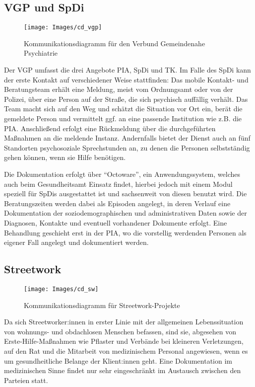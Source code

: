 \subsection{VGP und SpDi}\label{sub:vgp}

\begin{figure}[h]
	\centering
	\texttt{[image: Images/cd\_vgp]}
	\caption[Kommunikationsdiagramm VGP]{Kommunikationsdiagramm für den Verbund Gemeindenahe Psychiatrie}
	\label{fig:cdVGP}
\end{figure}

Der \ac{VGP} umfasst die drei Angebote \acf{PIA}, \acf{SpDi} und \acf{TK}. Im Falle des \ac{SpDi} kann der erste Kontakt auf verschiedener Weise stattfinden: Das mobile Kontakt- und Beratungsteam erhält eine Meldung, meist vom Ordnungsamt oder von der Polizei, über eine Person auf der Straße, die sich psychisch auffällig verhält. Das Team macht sich auf den Weg und schätzt die Situation vor Ort ein, berät die gemeldete Person und vermittelt ggf. an eine passende Institution wie z.B. die \ac{PIA}. Anschließend erfolgt eine Rückmeldung über die durchgeführten Maßnahmen an die meldende Instanz. Andernfalls bietet der Dienst auch an fünf Standorten psychosoziale Sprechstunden an, zu denen die Personen selbstständig gehen können, wenn sie Hilfe benötigen.

Die Dokumentation erfolgt über \enquote{Octoware}, ein Anwendungssystem, welches auch beim Gesundheitsamt Einsatz findet, hierbei jedoch mit einem Modul speziell für \acp{SpDi} ausgestattet ist und sachsenweit von diesen benutzt wird. Die Beratungszeiten werden dabei als Episoden angelegt, in deren Verlauf eine Dokumentation der soziodemographischen und administrativen Daten sowie der Diagnosen, Kontakte und eventuell vorhandener Dokumente erfolgt. Eine Behandlung geschieht erst in der \ac{PIA}, wo die vorstellig werdenden Personen als eigener Fall angelegt und dokumentiert werden.

\subsection{Streetwork}\label{sub:sw}

\begin{figure}[h]
	\centering
	\texttt{[image: Images/cd\_sw]}
	\caption[Kommunikationsdiagramm Streetwork]{Kommunikationsdiagramm für Streetwork-Projekte}
	\label{fig:cdSW}
\end{figure}

Da sich Streetworker:innen in erster Linie mit der allgemeinen Lebenssituation von wohnungs- und obdachlosen Menschen befassen, sind sie, abgesehen von Erste-Hilfe-Maßnahmen wie Pflaster und Verbände bei kleineren Verletzungen, auf den Rat und die Mitarbeit von medizinischem Personal angewiesen, wenn es um gesundheitliche Belange der Klient:innen geht. Eine Dokumentation im medizinischen Sinne findet nur sehr eingeschränkt im Austausch zwischen den Parteien statt.

